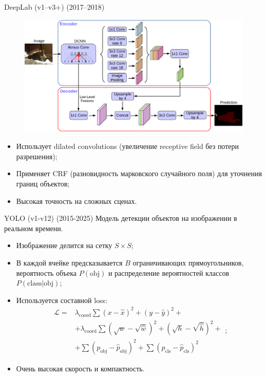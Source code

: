 \documentclass[notheorems, handout]{beamer}
\begin{document}
\begin{frame}{DeepLab (v1–v3+) (2017–2018)}
    \begin{figure}
        \includegraphics[width=\linewidth]{img/deeplab.png}
    \end{figure}

    \begin{itemize}
        \item Использует dilated convolutions (увеличение receptive field без потери разрешения);
        \item Применяет CRF (разновидность марковского случайного поля) для уточнения границ объектов;
        \item Высокая точность на сложных сценах.
    \end{itemize}
\end{frame}

\begin{frame}{YOLO (v1-v12) (2015-2025)}
    Модель детекции объектов на изображении в реальном времени.

    \begin{itemize}
        \item Изображение делится на сетку $S \times S$;
        \item В каждой ячейке предсказывается $B$ ограничивающих прямоугольников, вероятность объека $P(\text{obj})$ и распределение вероятностей классов $P(\text{class}|\text{obj})$;
        \item Используется составной loss:
        \[
            \begin{aligned}
                \mathcal{L} =& \lambda _{\text{coord}} \sum (x - \hat{x}) ^2 + (y - \hat{y}) ^2 +\\
                &+ \lambda _{\text{coord}} \sum (\sqrt{w} - \sqrt{\hat{w}}) ^2 + (\sqrt{h} - \sqrt{\hat{h}}) ^2 +\\
                &+ \sum (p _{\text{obj}} - \hat{p} _{\text{obj}})^2 + \sum (p _{\text{cls}} - \hat{p} _{\text{cls}}) ^2
            \end{aligned};
        \]
        \item Очень высокая скорость и компактность.
    \end{itemize}
\end{frame}
\end{document}
